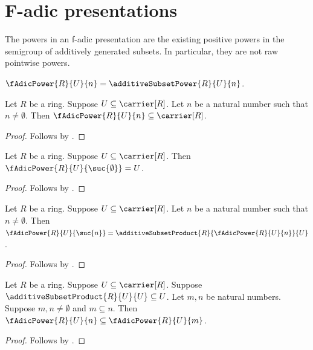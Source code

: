 


\section{F-adic presentations}

The powers in an f-adic presentation are the existing positive powers in the
semigroup of additively generated subsets.  In particular, they are not raw
pointwise powers.

\begin{definition}\label{f_adic_power}
    $\fAdicPower{R}{U}{n}=\additiveSubsetPower{R}{U}{n}$.
\end{definition}

\begin{proposition}\label{f_adic_power_type}
    Let $R$ be a ring. Suppose $U\subseteq\carrier[R]$.
    Let $n$ be a natural number such that $n\neq\emptyset$.
    Then $\fAdicPower{R}{U}{n}\subseteq\carrier[R]$.
\end{proposition}
\begin{proof}
    Follows by .
\end{proof}

\begin{proposition}\label{f_adic_power_one}
    Let $R$ be a ring. Suppose $U\subseteq\carrier[R]$.
    Then $\fAdicPower{R}{U}{\suc{\emptyset}}=U$.
\end{proposition}
\begin{proof}
    Follows by .
\end{proof}

\begin{proposition}\label{f_adic_power_successor}
    Let $R$ be a ring. Suppose $U\subseteq\carrier[R]$.
    Let $n$ be a natural number such that $n\neq\emptyset$.
    Then $\fAdicPower{R}{U}{\suc{n}}
        =\additiveSubsetProduct{R}{\fAdicPower{R}{U}{n}}{U}$.
\end{proposition}
\begin{proof}
    Follows by
        .
\end{proof}

\begin{theorem}\label{f_adic_power_antitone}
    Let $R$ be a ring. Suppose $U\subseteq\carrier[R]$.
    Suppose $\additiveSubsetProduct{R}{U}{U}\subseteq U$.
    Let $m,n$ be natural numbers.
    Suppose $m,n\neq\emptyset$ and $m\subseteq n$.
    Then $\fAdicPower{R}{U}{n}\subseteq\fAdicPower{R}{U}{m}$.
\end{theorem}
\begin{proof}
    Follows by .
\end{proof}

